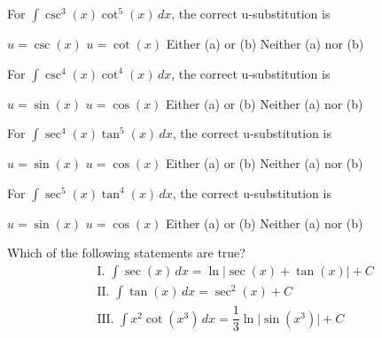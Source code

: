 \begin{questions}
    \question For $\int \csc^3 (x)\cot^5 (x) \, dx$, the correct u-substitution is \\

    \begin{oneparchoices}
        \choice $u = \csc (x)$
        \choice $u = \cot (x)$
        \choice Either (a) or (b) 
        \choice Neither (a) nor (b)
    \end{oneparchoices} \par \horizontalline

    \question For $\int \csc^4 (x)\cot^4 (x) \, dx$, the correct u-substitution is \\

    \begin{oneparchoices}
        \choice $u = \sin (x)$ 
        \choice $u = \cos (x)$
        \choice Either (a) or (b)
        \choice Neither (a) nor (b)
    \end{oneparchoices} \par \horizontalline

    \question For $\int \sec^4 (x)\tan^5 (x) \, dx$, the correct u-substitution is \\

    \begin{oneparchoices}
        \choice $u = \sin (x)$ 
        \choice $u = \cos (x)$
        \choice Either (a) or (b)
        \choice Neither (a) nor (b)
    \end{oneparchoices} \par \horizontalline

    \question For $\int \sec^5 (x)\tan^4 (x) \, dx$, the correct u-substitution is \\
    
    \begin{oneparchoices}
        \choice $u = \sin (x)$ 
        \choice $u = \cos (x)$
        \choice Either (a) or (b)
        \choice Neither (a) nor (b)
    \end{oneparchoices} \par \horizontalline

    \question Which of the following statements are true? \begin{align*}
        & \text{I. } \int \sec (x) \, dx = \ln |\sec (x) + \tan (x)| + C \\[11pt]
        & \text{II. } \int \tan (x) \, dx = \sec^2 (x) + C \\[11pt]
        & \text{III. } \int x^2\cot \left(x^3\right) \, dx = \dfrac{1}{3}\ln \bigg|\sin \left(x^3\right)\bigg| + C
    \end{align*}


\end{questions}
